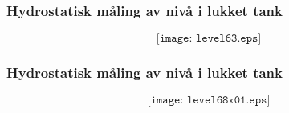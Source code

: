 \documentclass[aspectratio=169,xcolor=dvipsnames]{beamer}
\begin{document}
%
%
%
\begin{frame}
	\frametitle{Hydrostatisk måling av nivå i lukket tank}

	$$\texttt{[image: level63.eps]}$$
\end{frame}
%
%
%
%
%
\begin{frame}
	\frametitle{Hydrostatisk måling av nivå i lukket tank}

	$$\texttt{[image: level68x01.eps]}$$
\end{frame}
\end{document}
